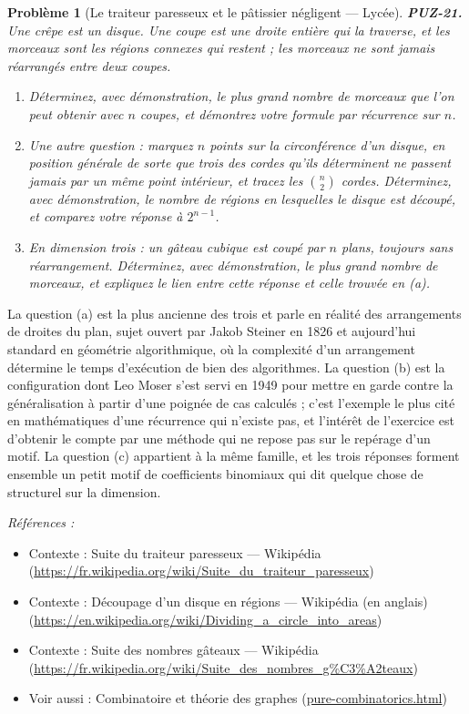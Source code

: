 \documentclass[11pt]{article}
\newtheorem{problem}{Problème}
\newenvironment{refs}{\par\small\noindent\emph{Références :}\begin{itemize}\setlength\itemsep{0pt}}{\end{itemize}\normalsize}
\begin{document}
\bigskip

\begin{problem}[{Le traiteur paresseux et le pâtissier négligent --- Lycée}]
\textbf{PUZ-21.} Une crêpe est un disque. Une coupe est une droite entière qui la traverse, et les morceaux sont les régions connexes qui restent ; les morceaux ne sont jamais réarrangés entre deux coupes.
\begin{enumerate}
\item[(a)] Déterminez, avec démonstration, le plus grand nombre de morceaux que l'on peut obtenir avec $ n $ coupes, et démontrez votre formule par récurrence sur $ n $.
\item[(b)] Une autre question : marquez $ n $ points sur la circonférence d'un disque, en position générale de sorte que trois des cordes qu'ils déterminent ne passent jamais par un même point intérieur, et tracez les $ \binom{n}{2} $ cordes. Déterminez, avec démonstration, le nombre de régions en lesquelles le disque est découpé, et comparez votre réponse à $ 2^{n-1} $.
\item[(c)] En dimension trois : un gâteau cubique est coupé par $ n $ plans, toujours sans réarrangement. Déterminez, avec démonstration, le plus grand nombre de morceaux, et expliquez le lien entre cette réponse et celle trouvée en (a).
\end{enumerate}

\end{problem}

\noindent La question (a) est la plus ancienne des trois et parle en réalité des arrangements de droites du plan, sujet ouvert par Jakob Steiner en 1826 et aujourd'hui standard en géométrie algorithmique, où la complexité d'un arrangement détermine le temps d'exécution de bien des algorithmes. La question (b) est la configuration dont Leo Moser s'est servi en 1949 pour mettre en garde contre la généralisation à partir d'une poignée de cas calculés ; c'est l'exemple le plus cité en mathématiques d'une récurrence qui n'existe pas, et l'intérêt de l'exercice est d'obtenir le compte par une méthode qui ne repose pas sur le repérage d'un motif. La question (c) appartient à la même famille, et les trois réponses forment ensemble un petit motif de coefficients binomiaux qui dit quelque chose de structurel sur la dimension.

\begin{refs}
\item Contexte : Suite du traiteur paresseux --- Wikipédia (\url{https://fr.wikipedia.org/wiki/Suite_du_traiteur_paresseux})
\item Contexte : Découpage d'un disque en régions --- Wikipédia (en anglais) (\url{https://en.wikipedia.org/wiki/Dividing_a_circle_into_areas})
\item Contexte : Suite des nombres gâteaux --- Wikipédia (\url{https://fr.wikipedia.org/wiki/Suite_des_nombres_g%C3%A2teaux})
\item Voir aussi : Combinatoire et théorie des graphes (\url{pure-combinatorics.html})
\end{refs}
\end{document}
